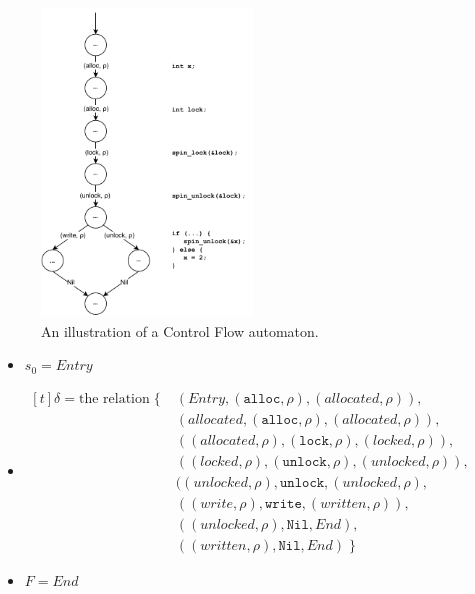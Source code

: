 \begin{figure}[H]
    \centering
    \includegraphics[width=0.5\textwidth]{background/figures/cfg_example}
    \caption{An illustration of a Control Flow automaton.}
    \label{cfg_example-automaton}
\end{figure}

\begin{itemize}
    \item $s_0 = Entry$ 
    \item {
        $
            \begin{aligned}[t]
            \delta = \text{the relation} \; \{ \; & (Entry, (\texttt{alloc},\rho), (allocated, \rho)), \\ 
            & (allocated, (\texttt{alloc},\rho), (allocated, \rho)), \\ 
            & ((allocated, \rho), (\texttt{lock}, \rho), (locked, \rho)), \\
            & ((locked, \rho), (\texttt{unlock}, \rho), (unlocked, \rho)), \\
            & ((unlocked, \rho), \texttt{unlock}, (unlocked, \rho), \\ 
            & ((write, \rho), \texttt{write}, (written, \rho)), \\ 
            & ((unlocked, \rho), \texttt{Nil}, End), \\ 
            & ((written, \rho), \texttt{Nil}, End) \; \}
            \end{aligned}
        $ 
    }
    \item $F = End$  
\end{itemize}

